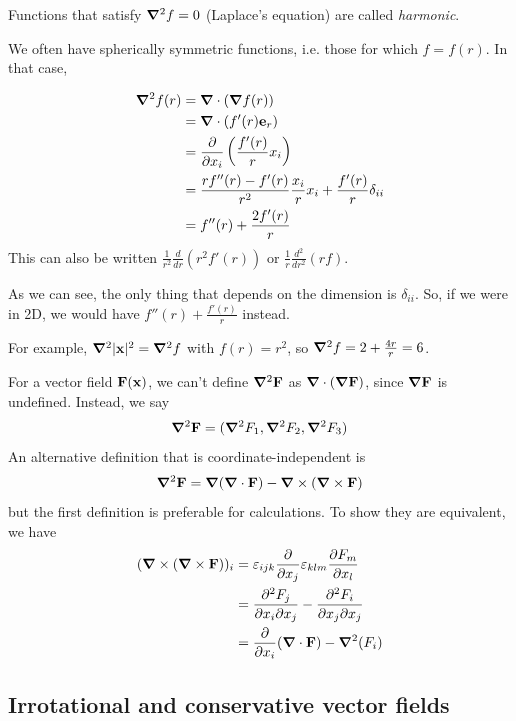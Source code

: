 \documentclass{../../template/note}
\begin{document}
    Functions that satisfy \(\grad^2 f = 0\) (Laplace's equation) are called \emph{harmonic}.

    We often have spherically symmetric functions, i.e. those for which \(f = f(r)\). In that case,

    \begin{align*}
        \grad^2 f(r) &= \grad \cdot (\grad f(r)) \\
        &= \grad \cdot (f'(r) \V e_r) \\
        &= \pd{}{x_i} \left(\frac{f'(r)}{r} x_i\right) \\
        &= \frac{rf''(r) - f'(r)}{r^2} \frac{x_i}{r} x_i + \frac{f'(r)}{r} \delta_{ii} \\
        &= f''(r) + \frac{2f'(r)}{r}
    \end{align*}
    This can also be written \(\frac{1}{r^2} \frac{d}{dr} (r^2 f'(r))\) or \(\frac{1}{r} \frac{d^2}{dr^2}(rf)\).

    \begin{remark*}
        As we can see, the only thing that depends on the dimension is \(\delta_{ii}\). So, if we were in 2D, we would have \(f''(r) + \frac{f'(r)}{r}\) instead.
    \end{remark*}
    For example, \(\grad^2 |\V x|^2 = \grad^2f\) with \(f(r) = r^2\), so \(\grad^2 f = 2 + \frac{4r}{r} = 6\).

    For a vector field \(\V F(\V x)\), we can't define \(\grad^2 \V F\) as \(\grad \cdot (\grad \V F)\), since \(\grad \V F\) is undefined. Instead, we say
    \begin{align*}
        \grad^2 \V F = (\grad^2 F_1, \grad^2 F_2, \grad^2 F_3)
    \end{align*}
    An alternative definition that is coordinate-independent is
    \begin{align*}
        \grad^2 \V F = \grad(\grad \cdot \V F) - \grad \times (\grad \times \V F)
    \end{align*}
    but the first definition is preferable for calculations. To show they are equivalent, we have
    \begin{align*}
        (\curl(\curl \V F))_i &= \lv{ijk} \pd{}{x_j} \lv{klm} \pd{F_m}{x_l} \\
        &= \pd{^2F_j}{x_i \partial x_j} - \pd{^2F_i}{x_j \partial x_j} \\
        &= \pd{}{x_i} (\grad \cdot \V F) - \grad^2(F_i)
    \end{align*}
    
    \subsection{Irrotational and conservative vector fields}
\end{document}

